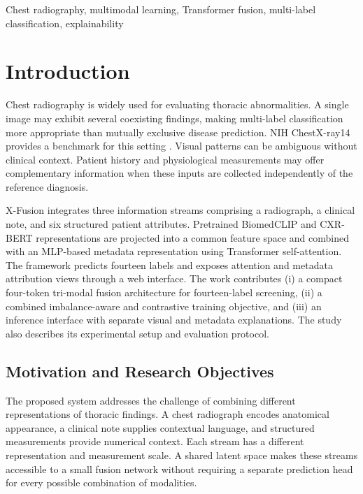 \documentclass[conference,letterpaper]{IEEEtran}
\begin{document}
\begin{IEEEkeywords}
Chest radiography, multimodal learning, Transformer fusion, multi-label classification, explainability
\end{IEEEkeywords}

\section{Introduction}

Chest radiography is widely used for evaluating thoracic abnormalities. A single image may exhibit several coexisting findings, making multi-label classification more appropriate than mutually exclusive disease prediction. NIH ChestX-ray14 provides a benchmark for this setting \cite{wang2017,nihdataset}. Visual patterns can be ambiguous without clinical context. Patient history and physiological measurements may offer complementary information when these inputs are collected independently of the reference diagnosis.

X-Fusion integrates three information streams comprising a radiograph, a clinical note, and six structured patient attributes. Pretrained BiomedCLIP and CXR-BERT representations are projected into a common feature space and combined with an MLP-based metadata representation using Transformer self-attention. The framework predicts fourteen labels and exposes attention and metadata attribution views through a web interface. The work contributes (i) a compact four-token tri-modal fusion architecture for fourteen-label screening, (ii) a combined imbalance-aware and contrastive training objective, and (iii) an inference interface with separate visual and metadata explanations. The study also describes its experimental setup and evaluation protocol.

\subsection{Motivation and Research Objectives}

The proposed system addresses the challenge of combining different representations of thoracic findings. A chest radiograph encodes anatomical appearance, a clinical note supplies contextual language, and structured measurements provide numerical context. Each stream has a different representation and measurement scale. A shared latent space makes these streams accessible to a small fusion network without requiring a separate prediction head for every possible combination of modalities.
\end{document}
